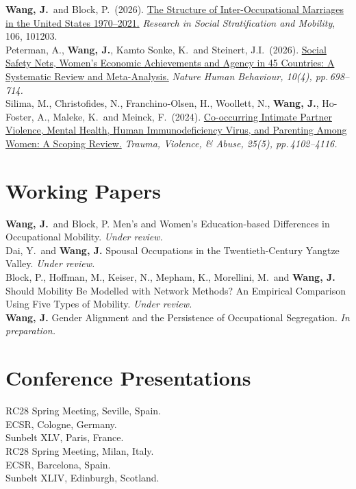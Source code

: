 \documentclass[11pt,a4paper]{article}
\newcommand{\yr}[1]{\makebox[3em][l]{\textbf{#1}}}
\begin{document}
\textbf{Wang, J.}\ and Block, P.\ (2026). \href{https://doi.org/10.1016/j.rssm.2026.101203}{The Structure of Inter-Occupational Marriages in the United States 1970--2021.} \textit{Research in Social Stratification and Mobility}, 106, 101203.\\[0.6em]
Peterman, A., \textbf{Wang, J.}, Kamto Sonke, K.\ and Steinert, J.I.\ (2026). \href{https://www.nature.com/articles/s41562-025-02394-0}{Social Safety Nets, Women's Economic Achievements and Agency in 45 Countries: A Systematic Review and Meta-Analysis.} \textit{Nature Human Behaviour, 10(4), pp.\,698--714.}\\[0.6em]
Silima, M., Christofides, N., Franchino-Olsen, H., Woollett, N., \textbf{Wang, J.}, Ho-Foster, A., Maleke, K.\ and Meinck, F.\ (2024). \href{https://journals.sagepub.com/doi/full/10.1177/15248380241268807}{Co-occurring Intimate Partner Violence, Mental Health, Human Immunodeficiency Virus, and Parenting Among Women: A Scoping Review.} \textit{Trauma, Violence, \& Abuse, 25(5), pp.\,4102--4116.}

\section{Working Papers}

\textbf{Wang, J.}\ and Block, P. Men's and Women's Education-based Differences in Occupational Mobility. \textit{Under review.}\\[0.4em]
Dai, Y.\ and \textbf{Wang, J.} Spousal Occupations in the Twentieth-Century Yangtze Valley. \textit{Under review.}\\[0.4em]
Block, P., Hoffman, M., Keiser, N., Mepham, K., Morellini, M.\ and \textbf{Wang, J.} Should Mobility Be Modelled with Network Methods? An Empirical Comparison Using Five Types of Mobility. \textit{Under review.}\\[0.4em]
\textbf{Wang, J.} Gender Alignment and the Persistence of Occupational Segregation. \textit{In preparation.}

\section{Conference Presentations}

\yr{2026}RC28 Spring Meeting, Seville, Spain.\\[0.4em]
\yr{2025}ECSR, Cologne, Germany.\\
\yr{}Sunbelt XLV, Paris, France.\\
\yr{}RC28 Spring Meeting, Milan, Italy.\\[0.4em]
\yr{2024}ECSR, Barcelona, Spain.\\
\yr{}Sunbelt XLIV, Edinburgh, Scotland.
\end{document}
